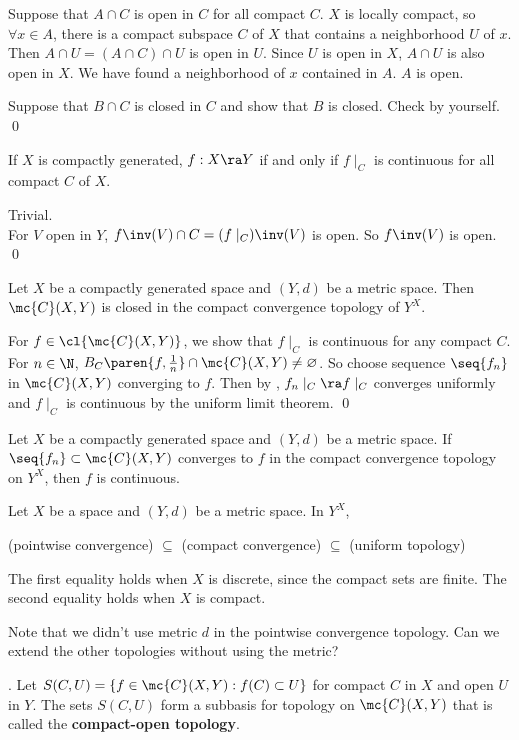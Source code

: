\pf {} Suppose that \(A \cap C\) is open in \(C\) for all compact \(C\). \(X\) is locally compact, so \(\forall x \in A\), there is a compact subspace \(C\) of \(X\) that contains a neighborhood \(U\) of \(x\). Then \(A \cap U = (A \cap C) \cap U\) is open in \(U\). Since \(U\) is open in \(X\), \(A \cap U\) is also open in \(X\). We have found a neighborhood of \(x\) contained in \(A\). \(A\) is open.

 Suppose that \(B \cap C\) is closed in \(C\) and show that \(B\) is closed. Check by yourself. \qed

 If \(X\) is compactly generated, \(f : X \ra Y\) if and only if \(f\mid_C\) is continuous for all compact \(C\) of \(X\).

\pf \note{\mimp} Trivial. \\
\note{\mimpd} For \(V\) open in \(Y\), \(f\inv(V) \cap C = (f\mid_C)\inv(V)\) is open. So \(f\inv(V)\) is open. \qed

 Let \(X\) be a compactly generated space and \((Y, d)\) be a metric space. Then \(\mc{C}(X, Y)\) is closed in the compact convergence topology of \(Y^X\).

\pf For \(f \in \cl{\mc{C}(X, Y)}\), we show that \(f \mid_C\) is continuous for any compact \(C\). For \(n \in \N\), \(B_C\paren{f, \frac{1}{n}} \cap \mc{C}(X, Y) \neq \varnothing\). So choose sequence \(\seq{f_n}\) in \(\mc{C}(X, Y)\) converging to \(f\). Then by , \(f_n \mid_C \ra f\mid_C\) converges uniformly and \(f\mid_C\) is continuous by the uniform limit theorem. \qed

 Let \(X\) be a compactly generated space and \((Y, d)\) be a metric space. If \(\seq{f_n} \subset \mc{C}(X, Y)\) converges to \(f\) in the compact convergence topology on \(Y^X\), then \(f\) is continuous.

 Let \(X\) be a space and \((Y, d)\) be a metric space. In \(Y^X\),
\begin{center}
    (pointwise convergence) \(\subseteq\) (compact convergence) \(\subseteq\) (uniform topology)
\end{center}
The first equality holds when \(X\) is discrete, since the compact sets are finite. The second equality holds when \(X\) is compact.

\rmk Note that we didn't use metric \(d\) in the pointwise convergence topology. Can we extend the other topologies without using the metric?

.  Let \(S(C, U) = \left\{f \in \mc{C}(X, Y) : f(C) \subset U\right\}\) for compact \(C\) in \(X\) and open \(U\) in \(Y\). The sets \(S(C, U)\) form a subbasis for topology on \(\mc{C}(X, Y)\) that is called the \textbf{compact-open topology}.


